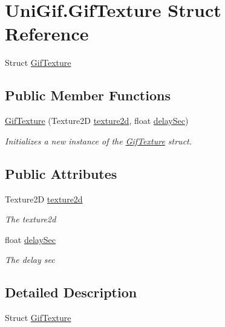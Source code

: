 \hypertarget{struct_uni_gif_1_1_gif_texture}{}\section{Uni\+Gif.\+Gif\+Texture Struct Reference}
\label{struct_uni_gif_1_1_gif_texture}


Struct \hyperlink{struct_uni_gif_1_1_gif_texture}{Gif\+Texture}  


\subsection*{Public Member Functions}
\begin{DoxyCompactItemize}
\item 
\hyperlink{struct_uni_gif_1_1_gif_texture_a1e46beef96f4ceb278e1a6430837fda1}{Gif\+Texture} (Texture2D \hyperlink{struct_uni_gif_1_1_gif_texture_a29f6af15d9586257ed3bf7592189f416}{texture2d}, float \hyperlink{struct_uni_gif_1_1_gif_texture_a319318dbe2d1f2d8ad53e4125e658f54}{delay\+Sec})
\begin{DoxyCompactList}\small\item\em Initializes a new instance of the \hyperlink{struct_uni_gif_1_1_gif_texture}{Gif\+Texture} struct. \end{DoxyCompactList}\end{DoxyCompactItemize}
\subsection*{Public Attributes}
\begin{DoxyCompactItemize}
\item 
Texture2D \hyperlink{struct_uni_gif_1_1_gif_texture_a29f6af15d9586257ed3bf7592189f416}{texture2d}
\begin{DoxyCompactList}\small\item\em The texture2d \end{DoxyCompactList}\item 
float \hyperlink{struct_uni_gif_1_1_gif_texture_a319318dbe2d1f2d8ad53e4125e658f54}{delay\+Sec}
\begin{DoxyCompactList}\small\item\em The delay sec \end{DoxyCompactList}\end{DoxyCompactItemize}


\subsection{Detailed Description}
Struct \hyperlink{struct_uni_gif_1_1_gif_texture}{Gif\+Texture} 



